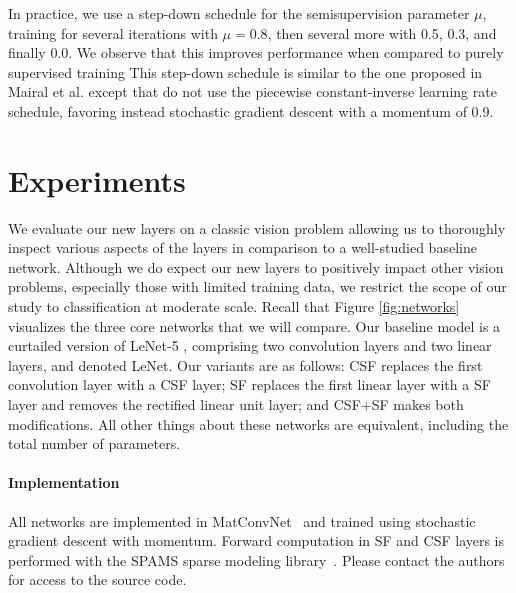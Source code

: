 \documentclass[10pt,twocolumn,letterpaper]{article}
\DeclareRobustCommand{\jason}[1]{{\hl{\;$^{\text{jason}}$ #1}}}
\begin{document}
In practice, we use a step-down schedule for the semisupervision parameter $\mu$, training for several iterations with $\mu=0.8$, then several more with 0.5, 0.3, and finally 0.0. We observe that this improves performance when compared to purely supervised training
This step-down schedule is similar to the one proposed in Mairal et al. \cite{MaBaPoTPAMI2012} except that do not use the piecewise constant-inverse learning rate schedule, favoring instead stochastic gradient descent with a momentum of 0.9.


%
%
%
%
%



\section{Experiments}
\label{sec:experiments}

We evaluate our new layers on a classic vision problem allowing us to thoroughly inspect various aspects of the layers in comparison to a well-studied baseline network.  Although we do expect our new layers to positively impact other vision problems, especially those with limited training data, we restrict the scope of our study to classification at moderate scale.  Recall that Figure \ref{fig:networks} visualizes the three core networks that we will compare.
Our baseline model is a curtailed version of LeNet-5 \cite{LeBoBeIEEE1998}, comprising two convolution layers and two linear layers, and denoted LeNet. Our variants are as follows: CSF replaces the first convolution layer with a CSF layer; SF replaces the first linear layer with a SF layer and removes the rectified linear unit layer; and CSF+SF makes both modifications.  All other things about these networks are equivalent, including the total number of parameters.  

\paragraph{Implementation} All networks are implemented in MatConvNet~ \cite{VeLeACMMulti2015} and trained using stochastic gradient descent with momentum. Forward computation in SF and CSF layers is performed with the SPAMS sparse modeling library~\cite{MaBaPoJMLR2010}.  Please contact the authors for access to the source code.
\end{document}

